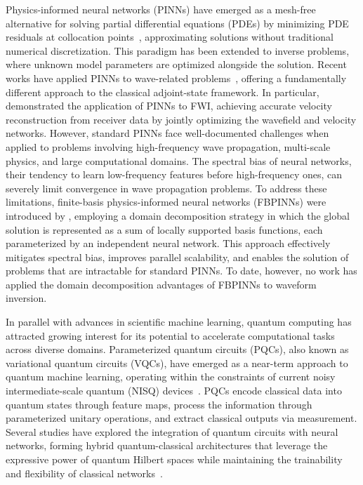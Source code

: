 \documentclass[11pt,a4paper]{article}
\begin{document}
Physics-informed neural networks (PINNs) have emerged as a mesh-free alternative for solving partial differential equations (PDEs) by minimizing PDE residuals at collocation points~\citep{RAISSI2019686}, approximating solutions without traditional numerical discretization. This paradigm has been extended to inverse problems, where unknown model parameters are optimized alongside the solution. Recent works have applied PINNs to wave-related problems~\citep{10.1093/gji/ggab010, waheed2021pinntomoseismictomographyusing, 10230537}, offering a fundamentally different approach to the classical adjoint-state framework. In particular, \citet{rahst} demonstrated the application of PINNs to FWI, achieving accurate velocity reconstruction from receiver data by jointly optimizing the wavefield and velocity networks. However, standard PINNs face well-documented challenges when applied to problems involving high-frequency wave propagation, multi-scale physics, and large computational domains. The spectral bias of neural networks, their tendency to learn low-frequency features before high-frequency ones, can severely limit convergence in wave propagation problems. To address these limitations, finite-basis physics-informed neural networks (FBPINNs) were introduced by \citet{Moseley2023}, employing a domain decomposition strategy in which the global solution is represented as a sum of locally supported basis functions, each parameterized by an independent neural network. This approach effectively mitigates spectral bias, improves parallel scalability, and enables the solution of problems that are intractable for standard PINNs. To date, however, no work has applied the domain decomposition advantages of FBPINNs to waveform inversion.

In parallel with advances in scientific machine learning, quantum computing has attracted growing interest for its potential to accelerate computational tasks across diverse domains. Parameterized quantum circuits (PQCs), also known as variational quantum circuits (VQCs), have emerged as a near-term approach to quantum machine learning, operating within the constraints of current noisy intermediate-scale quantum (NISQ) devices~\citep{Preskill2018quantumcomputingin}. PQCs encode classical data into quantum states through feature maps, process the information through parameterized unitary operations, and extract classical outputs via measurement. Several studies have explored the integration of quantum circuits with neural networks, forming hybrid quantum-classical architectures that leverage the expressive power of quantum Hilbert spaces while maintaining the trainability and flexibility of classical networks~\citep{PhysRevA.101.032308, Benedetti_2019, Ostaszewski2021structure}.
\end{document}
